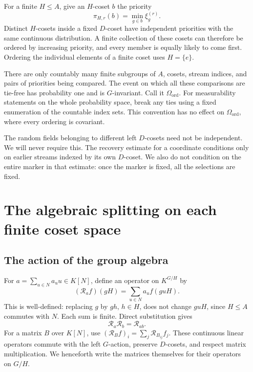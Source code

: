 \documentclass[11pt,a4paper]{article}
\numberwithin{equation}{section}
\begin{document}
For a finite $H\leq A$, give an $H$-coset $b$ the priority
\begin{equation}\label{eq:priorities}
 \pi_{H,r}(b)=\min_{g\in b}\xi_g^{(r)}.
\end{equation}
Distinct $H$-cosets inside a fixed $D$-coset have independent priorities
with the same continuous distribution. A finite collection of these
cosets can therefore be ordered by increasing priority, and every member
is equally likely to come first. Ordering the individual elements of a
finite coset uses $H=\{e\}$.

There are only countably many finite subgroups of $A$, cosets, stream
indices, and pairs of priorities being compared. The event on which all
these comparisons are tie-free has probability one and is $G$-invariant.
Call it $\Omega_{\mathrm{ord}}$. For measurability statements on the
whole probability space, break any ties using a fixed enumeration of the
countable index sets. This convention has no effect on
$\Omega_{\mathrm{ord}}$, where every ordering is covariant.

\begin{remark}\label{rem:local-independence}
The random fields belonging to different left $D$-cosets need not be
independent. We will never require this. The recovery estimate for a
coordinate conditions only on earlier streams indexed by its own
$D$-coset. We also do not condition on the entire marker in that estimate:
once the marker is fixed, all the selections are fixed.
\end{remark}

\section{The algebraic splitting on each finite coset space}\label{sec:split}

\subsection{The action of the group algebra}

For $a=\sum_{u\in N}a_u u\in K[N]$, define an operator on $K^{G/H}$ by
\begin{equation}\label{eq:operator}
 (\mathcal R_a f)(gH)=\sum_{u\in N}a_u f(guH).
\end{equation}
This is well-defined: replacing $g$ by $gh$, $h\in H$, does not change
$guH$, since $H\leq A$ commutes with $N$. Each sum is finite. Direct
substitution gives
\[
 \mathcal R_a\mathcal R_b=\mathcal R_{ab}.
\]
For a matrix $B$ over $K[N]$, use
$(\mathcal R_B f)_i=\sum_j\mathcal R_{B_{ij}}f_j$.
These continuous linear operators commute with the left $G$-action,
preserve $D$-cosets, and respect matrix multiplication. We henceforth
write the matrices themselves for their operators on $G/H$.
\end{document}
